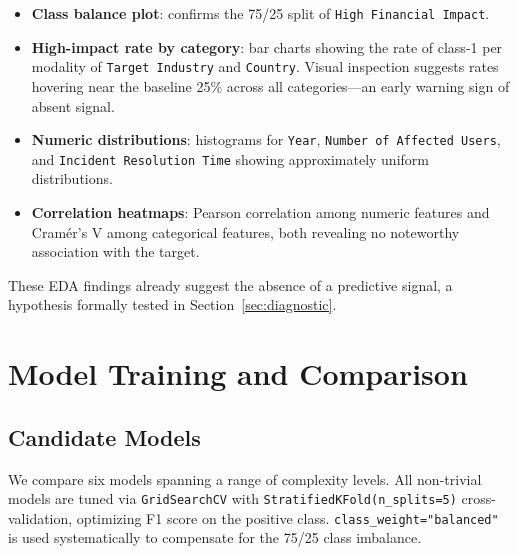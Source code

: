 \documentclass[a4paper,12pt]{article}
\begin{document}
\begin{itemize}[leftmargin=2cm]
    \item \textbf{Class balance plot}: confirms the 75/25 split of \texttt{High Financial Impact}.
    \item \textbf{High-impact rate by category}: bar charts showing the rate of class-1 per modality of \texttt{Target Industry} and \texttt{Country}. Visual inspection suggests rates hovering near the baseline 25\% across all categories---an early warning sign of absent signal.
    \item \textbf{Numeric distributions}: histograms for \texttt{Year}, \texttt{Number of Affected Users}, and \texttt{Incident Resolution Time} showing approximately uniform distributions.
    \item \textbf{Correlation heatmaps}: Pearson correlation among numeric features and Cram\'er's V among categorical features, both revealing no noteworthy association with the target.
\end{itemize}

These EDA findings already suggest the absence of a predictive signal, a hypothesis formally tested in Section~\ref{sec:diagnostic}.

\section{Model Training and Comparison}
\label{sec:training}

\subsection{Candidate Models}

We compare six models spanning a range of complexity levels. All non-trivial models are tuned via \texttt{GridSearchCV} with \texttt{StratifiedKFold(n\_splits=5)} cross-validation, optimizing F1 score on the positive class. \texttt{class\_weight="balanced"} is used systematically to compensate for the 75/25 class imbalance.
\end{document}
